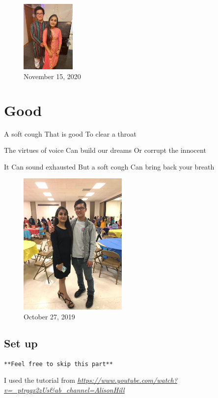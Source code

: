 \documentclass[
]{book}
\begin{document}
\begin{figure}
\centering
\includegraphics[width=1.04167in,height=\textheight]{mimages/4.1 11-15-2020.jpg}
\caption{November 15, 2020}
\end{figure}

\hypertarget{good}{%
\chapter{Good}\label{good}}

A soft cough
That is good
To clear a throat

The virtues of voice
Can build our dreams
Or corrupt the innocent

It Can sound exhausted
But a soft cough
Can bring back your breath

\begin{figure}
\centering
\includegraphics[width=2.08333in,height=\textheight]{mimages/0 8-27-2019.jpg}
\caption{October 27, 2019}
\end{figure}

\hypertarget{set-up}{%
\section{Set up}\label{set-up}}

\texttt{**Feel\ free\ to\ skip\ this\ part**}

I used the tutorial from \emph{\url{https://www.youtube.com/watch?v=_ptrgqx2zUs\&ab_channel=AlisonHill}}
\end{document}
